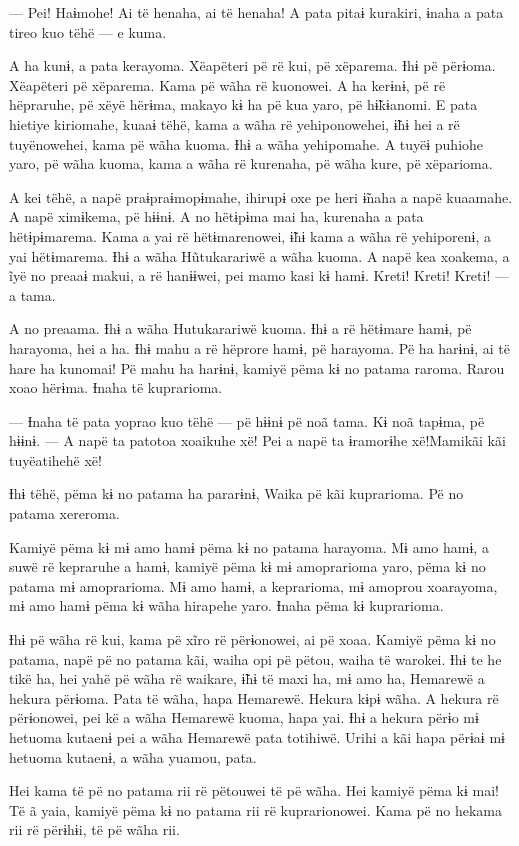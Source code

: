 --- Pei! Haɨmohe! Ai të henaha, ai të henaha! A pata pitaɨ kurakiri,
ɨnaha a pata tireo kuo tëhë --- e kuma.

A ha kunɨ, a pata kerayoma. Xëapëteri pë rë kui, pë xëparema. Ɨhɨ pë
përɨoma. Xëapëteri pë xëparema. Kama pë wãha rë kuonowei. A ha kerɨnɨ,
pë rë hëpraruhe, pë xëyë hërɨma, makayo kɨ ha pë kua yaro, pë hɨ̃kɨanomi.
E pata hietiye kiriomahe, kuaaɨ tëhë, kama a wãha rë yehiponowehei, ɨ̃hɨ
hei a rë tuyënowehei, kama pë wãha kuoma. Ɨhɨ a wãha yehipomahe. A tuyëɨ
puhiohe yaro, pë wãha kuoma, kama a wãha rë kurenaha, pë wãha kure, pë
xëparioma.

A kei tëhë, a napë praɨpraɨmopɨmahe, ihirupɨ oxe pe heri ɨ̃naha a napë
kuaamahe. A napë ximɨkema, pë hɨɨnɨ. A no hëtɨpɨma mai ha, kurenaha a
pata hëtɨpɨmarema. Kama a yai rë hëtɨmarenowei, ɨ̃hɨ kama a wãha rë
yehiporenɨ, a yai hëtɨmarema. Ɨhɨ a wãha Hũtukarariwë a wãha kuoma. A napë kea xoakema, a ĩyë no preaaɨ makui, a rë hanɨɨwei, pei mamo kasi kɨ
hamɨ. Kreti! Kreti! Kreti! --- a tama.

A no preaama. Ɨhɨ a wãha Hutukarariwë kuoma. Ɨhɨ a rë hëtɨmare hamɨ, pë
harayoma, hei a ha. Ɨhɨ mahu a rë hëprore hamɨ, pë harayoma. Pë ha
harɨnɨ, ai të hare ha kunomai! Pë mahu ha harɨnɨ, kamiyë pëma kɨ no
patama raroma. Rarou xoao hërɨma. Ɨnaha të kuprarioma. 

--- Ɨnaha të pata yoprao kuo tëhë --- pë hɨɨnɨ pë noã tama. Kɨ noã
tapɨma, pë hɨɨnɨ. --- A napë ta patotoa xoaikuhe xë! Pei a napë ta
ɨramorɨhe xë!Mamikãi kãi tuyëatihehë xë!

Ɨhɨ tëhë, pëma kɨ no patama ha pararɨnɨ, Waika pë kãi kuprarioma. Pë no
patama xereroma. 

Kamiyë pëma kɨ mɨ amo hamɨ pëma kɨ no patama harayoma. Mɨ amo hamɨ, a
suwë rë kepraruhe a hamɨ, kamiyë pëma kɨ mɨ amoprarioma yaro, pëma kɨ no
patama mɨ amoprarioma. Mɨ amo hamɨ, a keprarioma, mɨ amoprou xoarayoma,
mɨ amo hamɨ pëma kɨ wãha hirapehe yaro. Ɨnaha pëma kɨ kuprarioma. 

Ɨhɨ pë wãha rë kui, kama pë xĩro rë përɨonowei, ai pë xoaa. Kamiyë pëma
kɨ no patama, napë pë no patama kãi, waiha opi pë pëtou, waiha të
warokei. Ɨhɨ te he tikë ha, hei yahë pë wãha rë waikare, ɨ̃hɨ të maxi ha,
mɨ amo ha, Hemarewë a hekura përɨoma. Pata të wãha, hapa Hemarewë.
Hekura kɨpɨ wãha. A hekura rë përɨonowei, pei kë a wãha Hemarewë kuoma,
hapa yai. Ɨhɨ a hekura përɨo mɨ hetuoma kutaenɨ pei a wãha Hemarewë pata
totihiwë. Urihi a kãi hapa përɨaɨ mɨ hetuoma kutaenɨ, a wãha yuamou,
pata. 

Hei kama të pë no patama rii rë pëtouwei të pë wãha. Hei kamiyë pëma kɨ
mai! Të ã yaia, kamiyë pëma kɨ no patama rii rë kuprarionowei. Kama pë
no hekama rii rë përɨhɨi, të pë wãha rii. 

